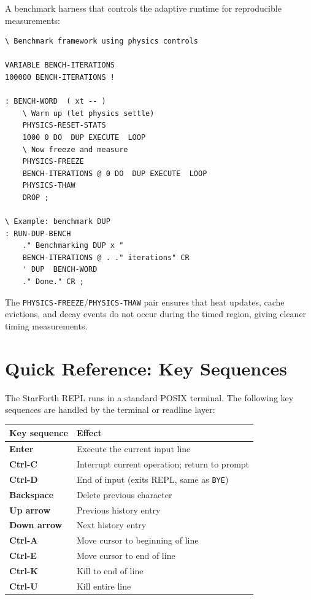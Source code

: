 A benchmark harness that controls the adaptive runtime for reproducible
measurements:

\begin{lstlisting}[language=Forth]
\ Benchmark framework using physics controls

VARIABLE BENCH-ITERATIONS
100000 BENCH-ITERATIONS !

: BENCH-WORD  ( xt -- )
    \ Warm up (let physics settle)
    PHYSICS-RESET-STATS
    1000 0 DO  DUP EXECUTE  LOOP
    \ Now freeze and measure
    PHYSICS-FREEZE
    BENCH-ITERATIONS @ 0 DO  DUP EXECUTE  LOOP
    PHYSICS-THAW
    DROP ;

\ Example: benchmark DUP
: RUN-DUP-BENCH
    ." Benchmarking DUP x "
    BENCH-ITERATIONS @ . ." iterations" CR
    ' DUP  BENCH-WORD
    ." Done." CR ;
\end{lstlisting}

The \texttt{PHYSICS-FREEZE}/\texttt{PHYSICS-THAW} pair ensures that heat
updates, cache evictions, and decay events do not occur during the timed
region, giving cleaner timing measurements.

\chapter{Quick Reference: Key Sequences}
\label{chap:key-sequences}


The StarForth REPL runs in a standard POSIX terminal. The following key
sequences are handled by the terminal or readline layer:

\begin{center}
\begin{tabular}{ll}
\toprule
Key sequence & Effect \\
\midrule
\textbf{Enter} & Execute the current input line \\
\textbf{Ctrl-C} & Interrupt current operation; return to prompt \\
\textbf{Ctrl-D} & End of input (exits REPL, same as \texttt{BYE}) \\
\textbf{Backspace} & Delete previous character \\
\textbf{Up arrow} & Previous history entry \\
\textbf{Down arrow} & Next history entry \\
\textbf{Ctrl-A} & Move cursor to beginning of line \\
\textbf{Ctrl-E} & Move cursor to end of line \\
\textbf{Ctrl-K} & Kill to end of line \\
\textbf{Ctrl-U} & Kill entire line \\
\bottomrule
\end{tabular}
\end{center}

